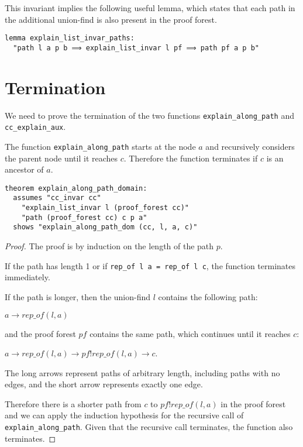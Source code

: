 This invariant implies the following useful lemma, which states that each path in the additional union-find is also present in the proof forest.

\begin{lstlisting}
lemma explain_list_invar_paths:
  "path l a p b ⟹ explain_list_invar l pf ⟹ path pf a p b"
\end{lstlisting}

\section{Termination}

We need to prove the termination of the two functions \lstinline{explain_along_path} and \lstinline{cc_explain_aux}.

The function \lstinline{explain_along_path} starts at the node $a$ and recursively considers the parent node until it reaches $c$. Therefore the function terminates if $c$ is an ancestor of $a$.

\begin{lstlisting}
theorem explain_along_path_domain:
  assumes "cc_invar cc"
    "explain_list_invar l (proof_forest cc)"
    "path (proof_forest cc) c p a"
  shows "explain_along_path_dom (cc, l, a, c)"
\end{lstlisting}

\begin{proof}
The proof is by induction on the length of the path $p$.

If the path has length 1 or if \lstinline{rep_of l a = rep_of l c}, the function terminates immediately.

If the path is longer, then the union-find $l$ contains the following path:

$a \longrightarrow rep\_of(l,a)$

and the proof forest $pf$ contains the same path, which continues until it reaches $c$:

$a \longrightarrow rep\_of(l,a) \rightarrow pf ! rep\_of(l,a) \longrightarrow c$.

The long arrows represent paths of arbitrary length, including paths with no edges, and the short arrow represents exactly one edge.

Therefore there is a shorter path from $c$ to $pf ! rep\_of(l,a)$ in the proof forest and we can apply the induction hypothesis for the recursive call of \lstinline{explain_along_path}. Given that the recursive call terminates, the function also terminates.
\end{proof}

